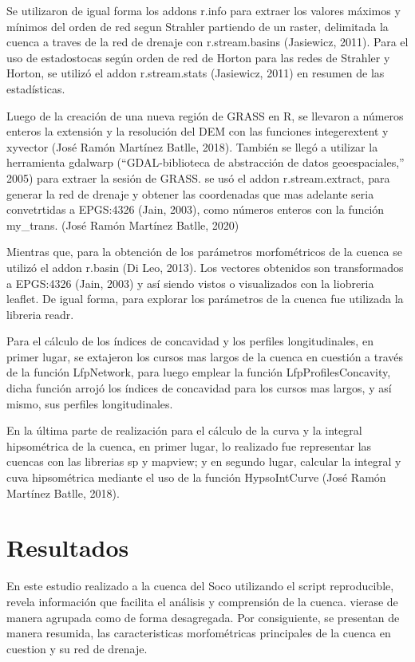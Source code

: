 \documentclass[11pt,]{article}
\begin{document}
Se utilizaron de igual forma los addons r.info para extraer los valores
máximos y mínimos del orden de red segun Strahler partiendo de un
raster, delimitada la cuenca a traves de la red de drenaje con
r.stream.basins (Jasiewicz, 2011). Para el uso de estadostocas según
orden de red de Horton para las redes de Strahler y Horton, se utilizó
el addon r.stream.stats (Jasiewicz, 2011) en resumen de las
estadísticas.

Luego de la creación de una nueva región de GRASS en R, se llevaron a
números enteros la extensión y la resolución del DEM con las funciones
integerextent y xyvector (José Ramón Martínez Batlle, 2018). También se
llegó a utilizar la herramienta gdalwarp (``GDAL-biblioteca de
abstracción de datos geoespaciales,'' 2005) para extraer la sesión de
GRASS. se usó el addon r.stream.extract, para generar la red de drenaje
y obtener las coordenadas que mas adelante seria convetrtidas a
EPGS:4326 (Jain, 2003), como números enteros con la función my\_trans.
(José Ramón Martínez Batlle, 2020)

Mientras que, para la obtención de los parámetros morfométricos de la
cuenca se utilizó el addon r.basin (Di Leo, 2013). Los vectores
obtenidos son transformados a EPGS:4326 (Jain, 2003) y así siendo vistos
o visualizados con la liobreria leaflet. De igual forma, para explorar
los parámetros de la cuenca fue utilizada la libreria readr.

Para el cálculo de los índices de concavidad y los perfiles
longitudinales, en primer lugar, se extajeron los cursos mas largos de
la cuenca en cuestión a través de la función LfpNetwork, para luego
emplear la función LfpProfilesConcavity, dicha función arrojó los
índices de concavidad para los cursos mas largos, y así mismo, sus
perfiles longitudinales.

En la última parte de realización para el cálculo de la curva y la
integral hipsométrica de la cuenca, en primer lugar, lo realizado fue
representar las cuencas con las librerias sp y mapview; y en segundo
lugar, calcular la integral y cuva hipsométrica mediante el uso de la
función HypsoIntCurve (José Ramón Martínez Batlle, 2018).

\section{Resultados}\label{resultados}

En este estudio realizado a la cuenca del Soco utilizando el script
reproducible, revela información que facilita el análisis y comprensión
de la cuenca. vierase de manera agrupada como de forma desagregada. Por
consiguiente, se presentan de manera resumida, las caracteristicas
morfométricas principales de la cuenca en cuestion y su red de drenaje.
\end{document}
